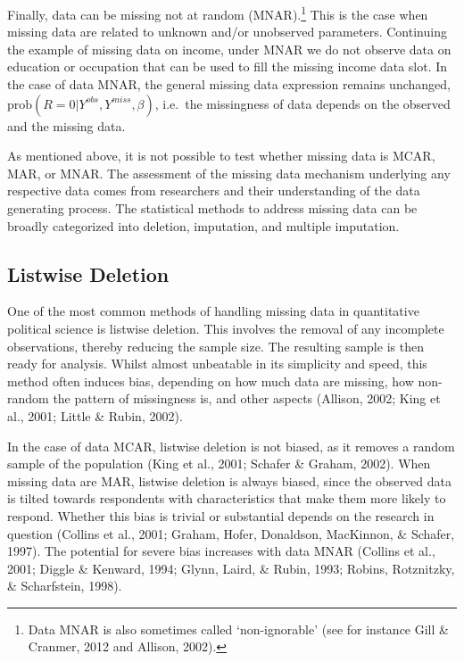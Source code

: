 \documentclass[12pt,econ]{sources/authesis}
\begin{document}
Finally, data can be missing not at random (MNAR).\footnote{Data MNAR is also sometimes called `non-ignorable' (see for instance Gill \& Cranmer, 2012 and Allison, 2002).} This is the case when missing data are related to unknown and/or unobserved parameters. Continuing the example of missing data on income, under MNAR we do not observe data on education or occupation that can be used to fill the missing income data slot. In the case of data MNAR, the general missing data expression remains unchanged, \(\text{prob}(R = 0 | Y^{obs}, Y^{miss}, \beta)\), i.e.~the missingness of data depends on the observed and the missing data.

As mentioned above, it is not possible to test whether missing data is MCAR, MAR, or MNAR. The assessment of the missing data mechanism underlying any respective data comes from researchers and their understanding of the data generating process. The statistical methods to address missing data can be broadly categorized into deletion, imputation, and multiple imputation.

\hypertarget{ordmiss-theory-delete}{%
\subsection{Listwise Deletion}\label{ordmiss-theory-delete}}

One of the most common methods of handling missing data in quantitative political science is listwise deletion. This involves the removal of any incomplete observations, thereby reducing the sample size. The resulting sample is then ready for analysis. Whilst almost unbeatable in its simplicity and speed, this method often induces bias, depending on how much data are missing, how non-random the pattern of missingness is, and other aspects (Allison, 2002; King et al., 2001; Little \& Rubin, 2002).

In the case of data MCAR, listwise deletion is not biased, as it removes a random sample of the population (King et al., 2001; Schafer \& Graham, 2002). When missing data are MAR, listwise deletion is always biased, since the observed data is tilted towards respondents with characteristics that make them more likely to respond. Whether this bias is trivial or substantial depends on the research in question (Collins et al., 2001; Graham, Hofer, Donaldson, MacKinnon, \& Schafer, 1997). The potential for severe bias increases with data MNAR (Collins et al., 2001; Diggle \& Kenward, 1994; Glynn, Laird, \& Rubin, 1993; Robins, Rotznitzky, \& Scharfstein, 1998).
\end{document}
